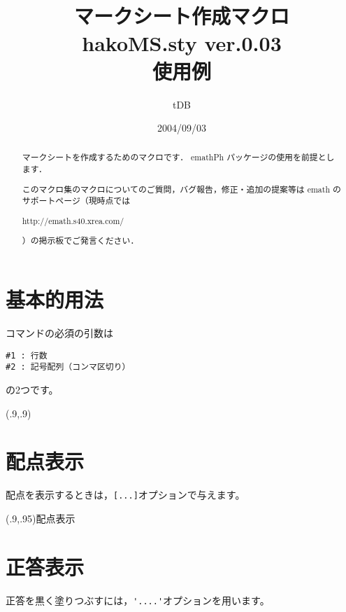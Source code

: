 \documentclass[a4j]{jarticle}
\begin{document}
\title{マークシート作成マクロ\\
hakoMS.sty {\normalsize ver.0.03}\\使用例}%
\author{tDB}%
\date{2004/09/03}%

\maketitle\thispagestyle{empty}%
\begin{abstract}%
マークシートを作成するためのマクロです．
emathPh パッケージの使用を前提とします．

このマクロ集のマクロについてのご質問，バグ報告，修正・追加の提案等は
emath のサポートページ（現時点では
\begin{center}
    http://emath.s40.xrea.com/
\end{center}
）の掲示板でご発言ください．
\end{abstract}
\pagebreak
{}%

\tableofcontents

\pagebreak


\section{基本的用法}
コマンドの必須の引数は
\begin{jquote}
\begin{verbatim}
#1 : 行数
#2 : 記号配列（コンマ区切り）
\end{verbatim}
\end{jquote}
の2つです。

\begin{showEx}(.9,.9){}
\end{showEx}

\section{配点表示}
配点を表示するときは，\verb+[...]+オプションで与えます。

\begin{showEx}(.9,.95){配点表示}
\end{showEx}
\newpage

\section{正答表示}
正答を黒く塗りつぶすには，\verb+'....'+オプションを用います。
\end{document}
